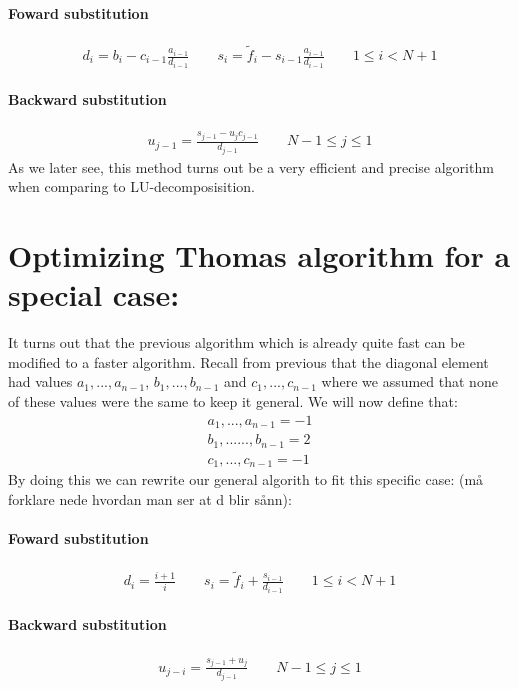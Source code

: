 \documentclass[a4paper, 10pt]{article}
\begin{document}
\paragraph{Foward substitution}
\begin{align}
  d_{i} = b_{i} - c_{i-1}\frac{a_{i-1}}{d_{i-1}}
  \qquad
  s_{i} = \tilde{f}_{i} - s_{i-1}\frac{a_{i-1}}{d_{i-1}} \qquad 1 \le i < N+1
\end{align}
\paragraph{Backward substitution}
\begin{align}
  u_{j-1} = \frac{s_{j-1} - u_{j}c_{j-1}}{d_{j-1}} \qquad  N-1 \le j \le 1
\end{align}
As we later see, this method turns out be a very efficient and precise algorithm
when comparing to LU-decomposisition.
\section{Optimizing Thomas algorithm for a special case:} It turns out that the previous
algorithm which is already quite fast can be modified to a faster algorithm. Recall from
previous that the diagonal element had values $a_{1},...,a_{n-1}$,
$b_{1},...,b_{n-1}$ and $c_{1},...,c_{n-1}$ where we assumed that none of these values were the same to keep it general.
We will now define that:
\begin{align}
  a_{1},...,a_{n-1} = -1
  \\
  b_{1},......,b_{n-1} = 2
  \\
  c_{1},...,c_{n-1} = -1
\end{align}
By doing this we can rewrite our general algorith to fit this specific case:
(må forklare nede hvordan man ser at d blir sånn):
\paragraph{Foward substitution}
\begin{align}
  d_{i} = \frac{i + 1}{i} 
  \qquad
  s_{i} = \tilde{f}_{i} + \frac{s_{i-1}}{d_{i-1}} \qquad 1 \le i < N+1
\end{align}
\paragraph{Backward substitution}
\begin{align}
  u_{j-i} = \frac{s_{j-1}+u_{j}}{d_{j-1}} \qquad  N-1 \le j \le 1
\end{align}
\end{document}
